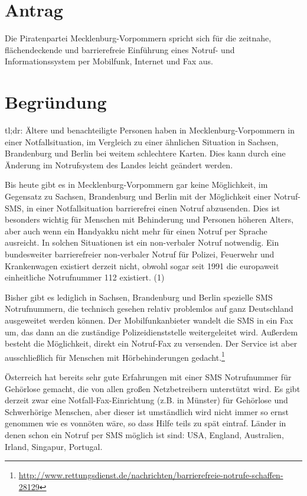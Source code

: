 \section{Antrag}

Die Piratenpartei Mecklenburg-Vorpommern spricht sich für die zeitnahe, flächendeckende und barrierefreie Einführung eines Notruf- und Informationssystem per Mobilfunk, Internet und Fax aus.

\section{Begründung}

tl;dr: Ältere und benachteiligte Personen haben in Mecklenburg-Vorpommern in einer Notfallsituation, im Vergleich zu einer ähnlichen Situation in Sachsen, Brandenburg und Berlin bei weitem schlechtere Karten. Dies kann durch eine Änderung im Notrufsystem des Landes leicht geändert werden.

Bis heute gibt es in Mecklenburg-Vorpommern gar keine Möglichkeit, im Gegensatz zu Sachsen, Brandenburg und Berlin mit der Möglichkeit einer Notruf-SMS, in einer Notfallsituation barrierefrei einen Notruf abzusenden. Dies ist besonders wichtig für Menschen mit Behinderung und Personen höheren Alters, aber auch wenn ein Handyakku nicht mehr für einen Notruf per Sprache ausreicht. In solchen Situationen ist ein non-verbaler Notruf notwendig. Ein bundesweiter barrierefreier non-verbaler Notruf für Polizei, Feuerwehr und Krankenwagen existiert derzeit nicht, obwohl sogar seit 1991 die europaweit einheitliche Notrufnummer 112 existiert. (1)

Bisher gibt es lediglich in Sachsen, Brandenburg und Berlin spezielle SMS Notrufnummern, die technisch gesehen relativ problemlos auf ganz Deutschland ausgeweitet werden können. Der Mobilfunkanbieter wandelt die SMS in ein Fax um, das dann an die zuständige Polizeidienststelle weitergeleitet wird. Außerdem besteht die Möglichkeit, direkt ein Notruf-Fax zu versenden. Der Service ist aber ausschließlich für Menschen mit Hörbehinderungen gedacht.\footnote{\url{http://www.rettungsdienst.de/nachrichten/barrierefreie-notrufe-schaffen-28129}}

Österreich hat bereits sehr gute Erfahrungen mit einer SMS Notrufnummer für Gehörlose gemacht, die von allen großen Netzbetreibern unterstützt wird. Es gibt derzeit zwar eine Notfall-Fax-Einrichtung (z.B. in Münster) für Gehörlose und Schwerhörige Menschen, aber dieser ist umständlich wird nicht immer so ernst genommen wie es vonnöten wäre, so dass Hilfe teils zu spät eintraf. Länder in denen schon ein Notruf per SMS möglich ist sind: USA, England, Australien, Irland, Singapur, Portugal.

